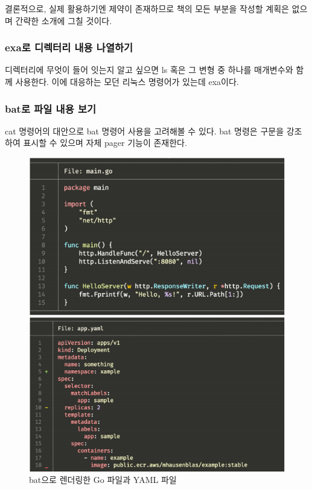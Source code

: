 \begin{flushleft}
    결론적으로, 실제 활용하기엔 제약이 존재하므로 책의 모든 부분을 작성할 계획은 없으며
    간략한 소개에 그칠 것이다.
\end{flushleft}

\subsubsection*{exa로 디렉터리 내용 나열하기}
\begin{flushleft}
    디렉터리에 무엇이 들어 잇는지 알고 싶으면 ls 혹은 그 변형 중 하나를 매개변수와 함께 사용한다.
    이에 대응하는 모던 리눅스 명령어가 있는데 exa이다.
\end{flushleft}

\subsubsection*{bat로 파일 내용 보기}
\begin{flushleft}
    cat 명령어의 대안으로 bat 명령어 사용을 고려해볼 수 있다.
    bat 명령은 구문을 강조하여 표시할 수 있으며 자체 pager 기능이 존재한다.
\end{flushleft}

\begin{figure}[H]
    \centering
    \includegraphics[width=15cm]{resource/3-bat-example.png}
    \caption{bat으로 렌더링한 Go 파일과 YAML 파일}
    \label{fig:bat-example}
\end{figure}


